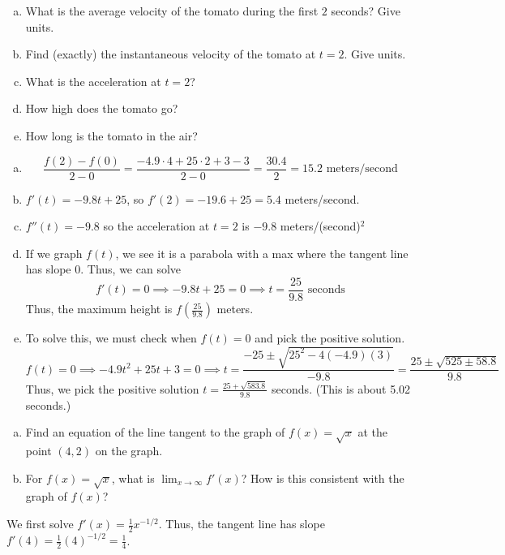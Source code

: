 \documentclass[11pt]{exam}
\begin{document}
\begin{questions}
\begin{enumerate}[(a)]
\item What is the average velocity of the tomato during the first $2$ seconds? Give units. 
\item Find (exactly) the instantaneous velocity of the tomato at $t=2$. Give units. 
\item What is the acceleration at $t=2$?
\item How high does the tomato go?
\item How long is the tomato in the air?
\end{enumerate}
\begin{solution}
  \begin{enumerate}[(a)]
  \item \[
\frac{f(2)-f(0)}{2-0} = \frac{-4.9\cdot 4 + 25 \cdot 2 + 3 - 3}{2-0} =
\frac{30.4}{2} = 15.2 \text{ meters/second}
    \]
  \item \(f'(t) = -9.8t+25\), so \(f'(2) = -19.6+25 = 5.4\) meters/second.
  \item \(f''(t) = -9.8\) so the acceleration at \(t=2\) is \(-9.8\) meters/(second)\({}^2\)
  \item If we graph \(f(t)\), we see it is a parabola with a max where
    the tangent line has slope \(0\). Thus, we can solve \[
      f'(t) = 0 \implies -9.8t+25 = 0 \implies t = \frac{25}{9.8}
      \text{ seconds}
    \]
    Thus, the maximum height is \(f(\frac{25}{9.8})\) meters.
  \item To solve this, we must check when \(f(t) = 0\) and pick the
    positive solution. \[
      f(t) = 0 \implies -4.9t^2+25t+3 = 0 \implies t = \frac{-25
      \pm \sqrt{25^2-4(-4.9)(3)}}{-9.8} = \frac{25 \pm \sqrt{525 \pm 58.8}}{9.8}
    \]
    Thus, we pick the positive solution \(t =
    \frac{25+\sqrt{583.8}}{9.8}\) seconds. (This is about 5.02 seconds.)
  \end{enumerate}
\end{solution}
\pagebreak
\question
  \begin{enumerate}[(a)]
  \item Find an equation of the line tangent to the graph of
    \(f(x) = \sqrt{x}\) at the point \((4,2)\) on the graph.
  \item For \(f(x) = \sqrt{x}\), what is \(\lim_{x\to \infty} f'(x)\)?
    How is this consistent with the graph of \(f(x)\)?
  \end{enumerate}
  \begin{solution}
    We first solve \(f'(x) = \frac{1}{2}x^{-1/2}\). Thus, the tangent
    line has slope \(f'(4) = \frac{1}{2} (4)^{-1/2} = \frac{1}{4}\).

\end{solution}
\end{questions}
\end{document}
